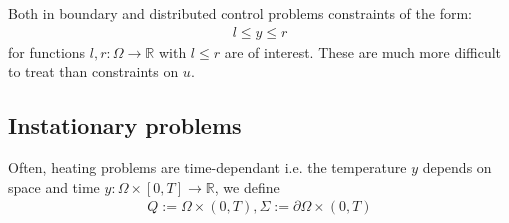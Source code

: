 \begin{example}
	Both in boundary and distributed control problems constraints of the form:
	\begin{align*}
		 l \le y \le r
	\end{align*}
	for functions $l, r: \Omega \rightarrow \mathbb{R}$ with $l \le r$ are of interest. These are much more difficult to treat than constraints on $u$. 
\end{example}


\subsection{Instationary problems}
Often, heating problems are time-dependant i.e. the temperature $y$ depends on space and time $y:\Omega \times [0, T] \rightarrow \mathbb{R}$, we define 
\begin{align*}
	Q:= \Omega \times (0, T), \Sigma:= \partial \Omega \times (0, T)
\end{align*}

